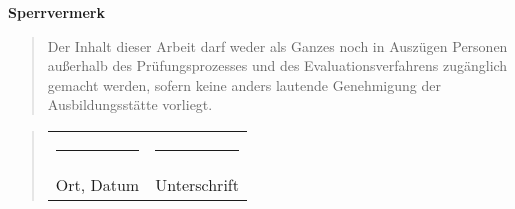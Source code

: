 \begin{titlepage}
	\begin{center}
		\vspace*{1cm}
		\Huge\bf Sperrvermerk\\
		\vspace*{2cm}
		\normalsize\rm
		\begin{quotation}
			\parbox{0.8\textwidth}{Der Inhalt dieser Arbeit darf weder als Ganzes noch in Auszügen Personen außerhalb des Prüfungsprozesses und des Evaluationsverfahrens zugänglich   gemacht werden, sofern keine anders lautende Genehmigung der Ausbildungsstätte vorliegt.}
		\end{quotation}
		\vspace*{1cm}
		\begin{quotation}
		  \parbox{0.8\textwidth}{
		  \begin{tabularx}{0.78\textwidth}{l@{\extracolsep\fill}l}
				\rule{4cm}{0.3mm}&\rule{4cm}{0.3mm}\\
	    	Ort, Datum&Unterschrift
			\end{tabularx}}
		\end{quotation}
	\end{center}
\end{titlepage}
\newpage
\setcounter{page}{3}
